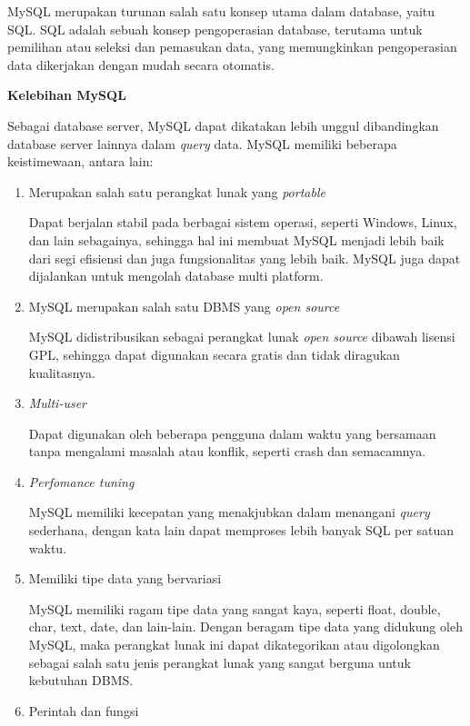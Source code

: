 \documentclass[a4paper,twoside]{article}
\begin{document}
\begin{enumerate}
MySQL merupakan turunan salah satu konsep utama dalam database, yaitu SQL. SQL adalah sebuah konsep pengoperasian database, terutama untuk pemilihan atau seleksi dan pemasukan data, yang memungkinkan pengoperasian data dikerjakan dengan mudah secara otomatis.

\textbf{Kelebihan MySQL}

Sebagai database server, MySQL dapat dikatakan lebih unggul dibandingkan database server lainnya dalam \textit{query} data. MySQL memiliki beberapa keistimewaan, antara lain:
		
		\begin{enumerate}
			\item Merupakan salah satu perangkat lunak yang \textit{portable}
			
			Dapat berjalan stabil pada berbagai sistem operasi, seperti Windows, Linux, dan lain sebagainya, sehingga hal ini membuat MySQL menjadi lebih baik dari segi efisiensi dan juga fungsionalitas yang lebih baik. MySQL juga dapat dijalankan untuk mengolah database multi platform. 
			
			\item MySQL merupakan salah satu DBMS yang \textit{open source}
			
			MySQL didistribusikan sebagai perangkat lunak \textit{open source}
			dibawah lisensi GPL, sehingga dapat digunakan secara gratis dan tidak diragukan kualitasnya. 
			
			\item \textit{Multi-user}
			
			Dapat digunakan oleh beberapa pengguna dalam waktu yang bersamaan tanpa mengalami masalah atau konflik, seperti crash dan semacamnya.
			
			\item \textit{Perfomance tuning}
			
			MySQL memiliki kecepatan yang menakjubkan dalam menangani \textit{query} sederhana, dengan kata lain dapat memproses lebih banyak SQL per satuan waktu.
			
			\item Memiliki tipe data yang bervariasi
			
			MySQL memiliki ragam tipe data yang sangat kaya, seperti float, double, char, text, date, dan lain-lain. Dengan beragam tipe data yang didukung oleh MySQL, maka perangkat lunak ini dapat dikategorikan atau digolongkan sebagai salah satu jenis perangkat lunak yang sangat berguna untuk kebutuhan DBMS.
			
			\item Perintah dan fungsi
			

\end{enumerate}
\end{enumerate}
\end{document}
